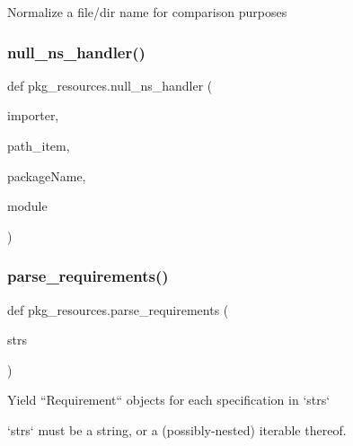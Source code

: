 \begin{DoxyVerb}Normalize a file/dir name for comparison purposes\end{DoxyVerb}
 \mbox{\label{namespacepkg__resources_a518a17d31aee5bf71eee289b82f966d9}} 
\subsubsection{\texorpdfstring{null\+\_\+ns\+\_\+handler()}{null\_ns\_handler()}}
{\footnotesize\ttfamily def pkg\+\_\+resources.\+null\+\_\+ns\+\_\+handler (\begin{DoxyParamCaption}\item[{}]{importer,  }\item[{}]{path\+\_\+item,  }\item[{}]{package\+Name,  }\item[{}]{module }\end{DoxyParamCaption})}

\mbox{\label{namespacepkg__resources_a2f0871c15153dc97a4a5b22c363a541e}} 
\subsubsection{\texorpdfstring{parse\+\_\+requirements()}{parse\_requirements()}}
{\footnotesize\ttfamily def pkg\+\_\+resources.\+parse\+\_\+requirements (\begin{DoxyParamCaption}\item[{}]{strs }\end{DoxyParamCaption})}

\begin{DoxyVerb}Yield ``Requirement`` objects for each specification in `strs`

`strs` must be a string, or a (possibly-nested) iterable thereof.
\end{DoxyVerb}
 \mbox{\label{namespacepkg__resources_acedac33b376a00a24ba64609617054d8}} 
